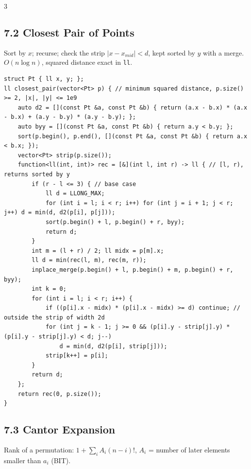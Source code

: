 \documentclass[8pt]{extarticle}
\begin{document}
\begin{multicols*}{3}
\subsection*{7.2 Closest Pair of Points}

Sort by $x$; recurse; check the strip $|x - x_{mid}| < d$, kept sorted by $y$ with a merge. $O(n \log n)$, squared distance exact in \texttt{ll}.

\begin{lstlisting}
struct Pt { ll x, y; };
ll closest_pair(vector<Pt> p) { // minimum squared distance, p.size() >= 2, |x|, |y| <= 1e9
    auto d2 = [](const Pt &a, const Pt &b) { return (a.x - b.x) * (a.x - b.x) + (a.y - b.y) * (a.y - b.y); };
    auto byy = [](const Pt &a, const Pt &b) { return a.y < b.y; };
    sort(p.begin(), p.end(), [](const Pt &a, const Pt &b) { return a.x < b.x; });
    vector<Pt> strip(p.size());
    function<ll(int, int)> rec = [&](int l, int r) -> ll { // [l, r), returns sorted by y
        if (r - l <= 3) { // base case
            ll d = LLONG_MAX;
            for (int i = l; i < r; i++) for (int j = i + 1; j < r; j++) d = min(d, d2(p[i], p[j]));
            sort(p.begin() + l, p.begin() + r, byy);
            return d;
        }
        int m = (l + r) / 2; ll midx = p[m].x;
        ll d = min(rec(l, m), rec(m, r));
        inplace_merge(p.begin() + l, p.begin() + m, p.begin() + r, byy);
        int k = 0;
        for (int i = l; i < r; i++) {
            if ((p[i].x - midx) * (p[i].x - midx) >= d) continue; // outside the strip of width 2d
            for (int j = k - 1; j >= 0 && (p[i].y - strip[j].y) * (p[i].y - strip[j].y) < d; j--)
                d = min(d, d2(p[i], strip[j]));
            strip[k++] = p[i];
        }
        return d;
    };
    return rec(0, p.size());
}
\end{lstlisting}

\subsection*{7.3 Cantor Expansion}

Rank of a permutation: $1 + \sum_i A_i (n - i)!$, $A_i$ = number of later elements smaller than $a_i$ (BIT).


\end{multicols*}
\end{document}
